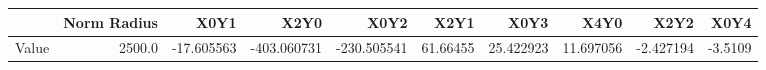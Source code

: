 \documentclass[convert={convertexe={magick.exe}, density={150}}]{standalone}
\begin{document}
\begin{tabular}{lrrrrrrrrr}
\toprule
{} &  Norm Radius &       X0Y1 &        X2Y0 &        X0Y2 &      X2Y1 &       X0Y3 &       X4Y0 &      X2Y2 &    X0Y4 \\
\midrule
Value &       2500.0 & -17.605563 & -403.060731 & -230.505541 &  61.66455 &  25.422923 &  11.697056 & -2.427194 & -3.5109 \\
\bottomrule
\end{tabular}
\end{document}
